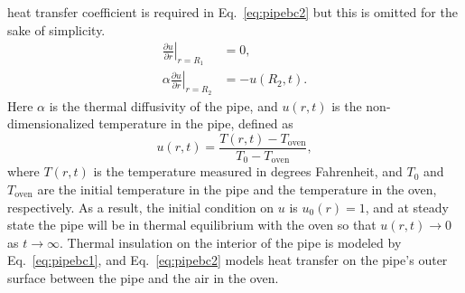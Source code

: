 \documentclass[11pt]{article}
\begin{document}
\begin{enumerate}
{    heat transfer coefficient is required in Eq.~\ref{eq:pipebc2} but this is
    omitted for the sake of simplicity.}
    \begin{align}
      \left.\frac{\partial u}{\partial r}\right|_{r=R_1} &= 0, \label{eq:pipebc1} \\
      \left.\alpha \frac{\partial u}{\partial r}\right|_{r=R_2} &= -u(R_2,t). \label{eq:pipebc2}
    \end{align}
    Here $\alpha$ is the thermal diffusivity of the pipe, and $u(r,t)$ is the
    non-dimensionalized temperature in the pipe, defined as
    \begin{equation}
      u(r,t) = \frac{T(r,t) - T_\text{oven}}{T_0 - T_\text{oven}},
    \end{equation}
    where $T(r,t)$ is the temperature measured in degrees Fahrenheit, and $T_0$
    and $T_\text{oven}$ are the initial temperature in the pipe and the
    temperature in the oven, respectively. As a result, the initial condition
    on $u$ is $u_0(r) = 1$, and at steady state the pipe will be in thermal
    equilibrium with the oven so that $u(r,t) \to 0$ as $t \to \infty$. Thermal
    insulation on the interior of the pipe is modeled by Eq.~\ref{eq:pipebc1},
    and Eq.~\ref{eq:pipebc2} models heat transfer on the pipe's outer surface
    between the pipe and the air in the oven.


\end{enumerate}
\end{document}
